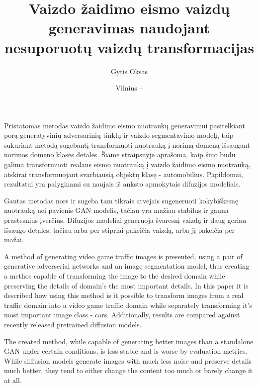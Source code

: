\documentclass{VUMIFPSbakalaurinis}
\institute{Informatikos institutas}
\title{Vaizdo žaidimo eismo vaizdų generavimas naudojant nesuporuotų vaizdų transformacijas}
\author{Gytis Oksas}
\date{Vilnius – \the\year}
\begin{document}
\maketitle
\setcounter{page}{2}

    Pristatomas metodas vaizdo žaidimo eismo nuotraukų generavimui pasitelkiant porą generatyvinių adversarinių tinklų ir vaizdo segmentavimo modelį, taip sukuriant metodą sugebantį transformuoti nuotrauką į norimą domeną išsaugant norimos domeno klasės detales. Šiame straipsnyje aprašoma, kaip šiuo būdu galima transformuoti realaus eismo nuotrauką į vaizdo žaidimo eismo nuotrauką, atskirai transformuojant svarbiausią objektų klasę - automobilius. Papildomai, rezultatai yra palyginami su naujais iš anksto apmokytais difuzijos modeliais.

    Gautas metodas nors ir sugeba tam tikrais atvejais sugeneruoti kokybiškesnę nuotrauką nei pavienis GAN modelis, tačiau yra mažiau stabilus ir gauna prastesnius įverčius. Difuzijos modeliai generuoja švaresnį vaizdą ir daug geriau išsaugo detales, tačiau arba per stipriai pakeičia vaizdą, arba jį pakeičia per mažai.


    A method of generating video game traffic images is presented, using a pair of generative adverserial networks and an image segmentation model, thus creating a methos capable of transforming the image to the desired domain while preserving the details of domain's the most important details. In this paper it is described how using this method is it possible to transform images from a real traffic domain into a video game traffic domain while separately transforming it's most important image class - cars. Additionally, results are compared against recently released pretrained diffusion models.

    The created method, while capable of generating better images than a standalone GAN under certain conditions, is less stable and is worse by evaluation metrics. While diffusion models generate images with much less noise and preserve details much better, they tend to either change the content too much or barely change it at all. 
    

\tableofcontents
\end{document}
